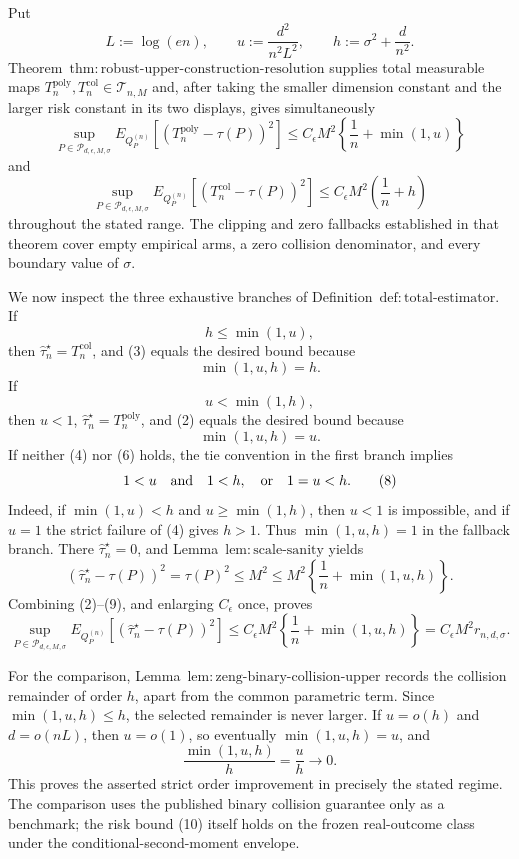 Put
\[
 L:=\log(en),\qquad
 u:=\frac{d^2}{n^2L^2},\qquad
 h:=\sigma^2+\frac d{n^2}.
\tag{1}
\]
Theorem~\(\mathrm{thm:robust\text{-}upper\text{-}construction\text{-}resolution}\) supplies total measurable maps \(T_n^{\mathrm{poly}},T_n^{\mathrm{col}}\in\mathcal T_{n,M}\) and, after taking the smaller dimension constant and the larger risk constant in its two displays, gives simultaneously
\[
 \sup_{P\in\mathcal P_{d,\epsilon,M,\sigma}}
 E_{Q_P^{(n)}}[(T_n^{\mathrm{poly}}-\tau(P))^2]
 \le C_{\epsilon}M^2\left\{\frac1n+\min(1,u)\right\}
\tag{2}
\]
and
\[
 \sup_{P\in\mathcal P_{d,\epsilon,M,\sigma}}
 E_{Q_P^{(n)}}[(T_n^{\mathrm{col}}-\tau(P))^2]
 \le C_{\epsilon}M^2\left(\frac1n+h\right)
\tag{3}
\]
throughout the stated range.  The clipping and zero fallbacks established in that theorem cover empty empirical arms, a zero collision denominator, and every boundary value of \(\sigma\).

We now inspect the three exhaustive branches of Definition~\(\mathrm{def:total\text{-}estimator}\).  If
\[
 h\le\min(1,u),
\tag{4}
\]
then \(\widehat\tau_n^{\star}=T_n^{\mathrm{col}}\), and (3) equals the desired bound because
\[
 \min(1,u,h)=h.
\tag{5}
\]
If
\[
 u<\min(1,h),
\tag{6}
\]
then \(u<1\), \(\widehat\tau_n^{\star}=T_n^{\mathrm{poly}}\), and (2) equals the desired bound because
\[
 \min(1,u,h)=u.
\tag{7}
\]
If neither (4) nor (6) holds, the tie convention in the first branch implies
\[
 1<u\quad\hbox{and}\quad 1<h,
\quad\hbox{or}\quad
 1=u<h.
\tag{8}
\]
Indeed, if \(\min(1,u)<h\) and \(u\ge\min(1,h)\), then \(u<1\) is impossible, and if \(u=1\) the strict failure of (4) gives \(h>1\).  Thus \(\min(1,u,h)=1\) in the fallback branch.  There \(\widehat\tau_n^{\star}=0\), and Lemma~\(\mathrm{lem:scale\text{-}sanity}\) yields
\[
 (\widehat\tau_n^{\star}-\tau(P))^2=\tau(P)^2
 \le M^2
 \le M^2\left\{\frac1n+\min(1,u,h)\right\}.
\tag{9}
\]
Combining (2)--(9), and enlarging \(C_{\epsilon}\) once, proves
\[
 \sup_{P\in\mathcal P_{d,\epsilon,M,\sigma}}
 E_{Q_P^{(n)}}[(\widehat\tau_n^{\star}-\tau(P))^2]
 \le C_{\epsilon}M^2
 \left\{\frac1n+\min(1,u,h)\right\}
 =C_{\epsilon}M^2r_{n,d,\sigma}.
\tag{10}
\]

For the comparison, Lemma~\(\mathrm{lem:zeng\text{-}binary\text{-}collision\text{-}upper}\) records the collision remainder of order \(h\), apart from the common parametric term.  Since \(\min(1,u,h)\le h\), the selected remainder is never larger.  If \(u=o(h)\) and \(d=o(nL)\), then \(u=o(1)\), so eventually \(\min(1,u,h)=u\), and
\[
 \frac{\min(1,u,h)}{h}=\frac uh\longrightarrow0.
\tag{11}
\]
This proves the asserted strict order improvement in precisely the stated regime.  The comparison uses the published binary collision guarantee only as a benchmark; the risk bound (10) itself holds on the frozen real-outcome class under the conditional-second-moment envelope.